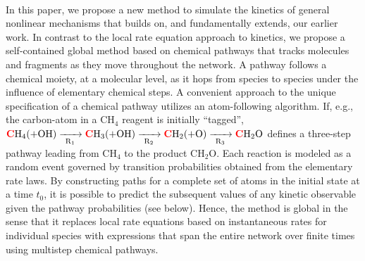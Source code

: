 \paragraph{}
In this paper, we propose a new method to simulate the kinetics of general nonlinear mechanisms that builds on, and fundamentally extends, our earlier work.\cite{ch4_7_kramer2014following,ch4_8_bai2014sum,ch4_9_bai2015sum,ch4_10_bai2016sum} In contrast to the local rate equation approach to kinetics, we propose a self-contained global method based on chemical pathways that tracks molecules and fragments as they move throughout the network.  A pathway follows a chemical moiety, at a molecular level, as it hops from species to species under the influence of elementary chemical steps. A convenient approach to the unique specification of a chemical pathway utilizes an atom-following algorithm.  If, e.g., the carbon-atom in a CH$_4$ reagent is initially “tagged”,  $\textcolor{red}{\textbf{C}}\text{H}_4(+\text{OH}) \xrightarrow[\text{R}_{1}]{\makebox[0.6cm]{}} \textcolor{red}{\textbf{C}}\text{H}_3 (+\text{OH})  \xrightarrow[\text{R}_{2}]{\makebox[0.6cm]{}} \textcolor{red}{\textbf{C}}\text{H}_2 (+\text{O}) \xrightarrow[\text{R}_{3}]{\makebox[0.6cm]{}} \textcolor{red}{\textbf{C}}\text{H}_2\text{O}$ defines a three-step pathway leading from CH$_4$ to the product CH$_2$O.  Each reaction is modeled as a random event governed by transition probabilities obtained from the elementary rate laws.  By constructing paths for a complete set of atoms in the initial state at a time $t_0$, it is possible to predict the subsequent values of any kinetic observable given the pathway probabilities (see below).  Hence, the method is global in the sense that it replaces local rate equations based on instantaneous rates for individual species with expressions that span the entire network over finite times using multistep chemical pathways.
\newline
